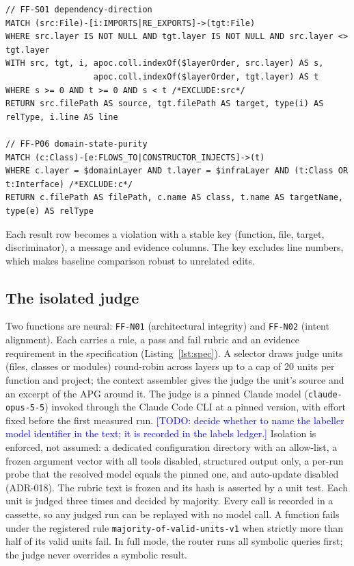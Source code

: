 \documentclass[10pt,a4paper]{article}
\newcommand{\todo}[1]{\textcolor{blue}{[TODO: #1]}}
\newcommand{\ff}[1]{\texttt{\small #1}}
\begin{document}
\begin{lstlisting}[style=cypher,caption={Two compiled templates (abridged from \texttt{src/fitness-compiler/cypher-templates.ts}).},label={lst:cypher},float=t]
// FF-S01 dependency-direction
MATCH (src:File)-[i:IMPORTS|RE_EXPORTS]->(tgt:File)
WHERE src.layer IS NOT NULL AND tgt.layer IS NOT NULL AND src.layer <> tgt.layer
WITH src, tgt, i, apoc.coll.indexOf($layerOrder, src.layer) AS s,
                  apoc.coll.indexOf($layerOrder, tgt.layer) AS t
WHERE s >= 0 AND t >= 0 AND s < t /*EXCLUDE:src*/
RETURN src.filePath AS source, tgt.filePath AS target, type(i) AS relType, i.line AS line

// FF-P06 domain-state-purity
MATCH (c:Class)-[e:FLOWS_TO|CONSTRUCTOR_INJECTS]->(t)
WHERE c.layer = $domainLayer AND t.layer = $infraLayer AND (t:Class OR t:Interface) /*EXCLUDE:c*/
RETURN c.filePath AS filePath, c.name AS class, t.name AS targetName, type(e) AS relType
\end{lstlisting}

Each result row becomes a violation with a stable key (function, file, target, discriminator), a message and
evidence columns. The key excludes line numbers, which makes baseline comparison robust to unrelated edits.

\subsection{The isolated judge}\label{sec:judge}

Two functions are neural: \ff{FF-N01} (architectural integrity) and \ff{FF-N02} (intent alignment). Each carries a
rule, a pass and fail rubric and an evidence requirement in the specification (Listing~\ref{lst:spec}). A selector
draws judge units (files, classes or modules) round-robin across layers up to a cap of 20 units per function and
project; the context assembler gives the judge the unit's source and an excerpt of the APG around it.
The judge is a pinned Claude model (\texttt{claude-opus-5-5}) invoked through the Claude Code CLI at a pinned
version, with effort fixed before the first measured run. %
\todo{decide whether to name the labeller model identifier in the text; it is recorded in the labels ledger.}
Isolation is enforced, not assumed: a dedicated configuration directory with an allow-list, a frozen argument vector
with all tools disabled, structured output only, a per-run probe that the resolved model equals the pinned one, and
auto-update disabled (ADR-018). The rubric text is frozen and its hash is asserted by a unit test. Each unit is judged
three times and decided by majority. Every call is recorded in a cassette, so any judged run can be replayed with no
model call. A function fails under the registered rule \texttt{majority-of-valid-units-v1} when strictly more than
half of its valid units fail. %
In full mode, the router runs all symbolic queries first; the judge never overrides a symbolic result.
\end{document}
